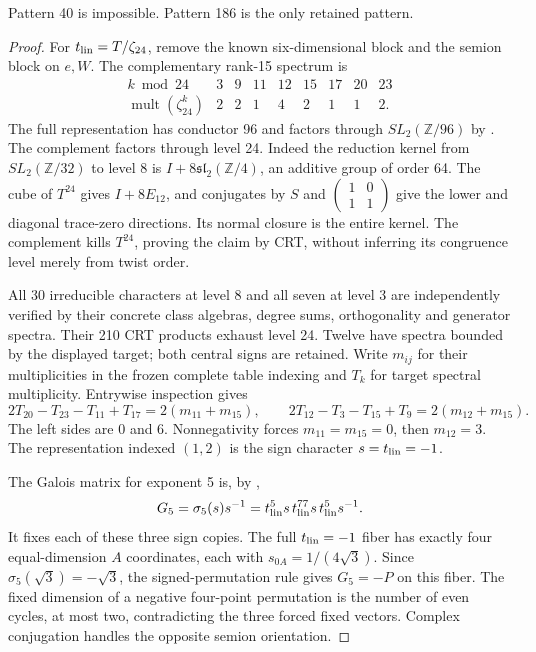 \begin{proposition}\label{prop:r928-pattern40}
Pattern 40 is impossible. Pattern 186 is the only retained pattern.
\end{proposition}
\begin{proof}
For $t_{\rm lin}=T/\zeta_{24}$, remove the known six-dimensional block
and the semion block on $e,W$. The complementary rank-15 spectrum is
\[
\begin{array}{c|rrrrrrrr}
k\bmod24&3&9&11&12&15&17&20&23\\ \hline
\operatorname{mult}(\zeta_{24}^k)&2&2&1&4&2&1&1&2 .
\end{array}
\]
The full representation has conductor 96 and factors through
$SL_2(\mathbb Z/96)$ by \cite[Theorem~II]{DLNGalois}.
The complement factors through level 24. Indeed the reduction kernel
from $SL_2(\mathbb Z/32)$ to level 8 is
$I+8\mathfrak{sl}_2(\mathbb Z/4)$, an additive group of order 64.
The cube of $T^{24}$ gives $I+8E_{12}$, and conjugates by $S$ and
$\left(\begin{smallmatrix}1&0\\1&1\end{smallmatrix}\right)$ give
the lower and diagonal trace-zero directions. Its normal closure is
the entire kernel. The complement kills $T^{24}$, proving the claim
by CRT, without inferring its congruence level merely from twist order.

All 30 irreducible characters at level 8 and all seven at level 3
are independently verified by their concrete class algebras, degree
sums, orthogonality and generator spectra. Their 210 CRT products
exhaust level 24. Twelve have spectra bounded by the displayed target;
both central signs are retained. Write $m_{ij}$ for their
multiplicities in the frozen complete table indexing and $T_k$ for
target spectral multiplicity. Entrywise inspection gives
\[
2T_{20}-T_{23}-T_{11}+T_{17}=2(m_{11}+m_{15}),\qquad
2T_{12}-T_3-T_{15}+T_9=2(m_{12}+m_{15}).
\]
The left sides are 0 and 6. Nonnegativity forces $m_{11}=m_{15}=0$,
then $m_{12}=3$. The representation indexed $(1,2)$ is the sign
character $s=t_{\rm lin}=-1$.

The Galois matrix for exponent 5 is, by \cite[Theorem~II]{DLNGalois},
\[
G_5=\sigma_5(s)s^{-1}
=t_{\rm lin}^5s\,t_{\rm lin}^{77}s\,t_{\rm lin}^5s^{-1}.
\]
It fixes each of these three sign copies. The full $t_{\rm lin}=-1$
fiber has exactly four equal-dimension $A$ coordinates, each with
$s_{0A}=1/(4\sqrt3)$. Since $\sigma_5(\sqrt3)=-\sqrt3$,
the signed-permutation rule gives $G_5=-P$ on this fiber.
The fixed dimension of a negative four-point permutation is the
number of even cycles, at most two, contradicting the three forced
fixed vectors. Complex conjugation handles the opposite semion
orientation.
\end{proof}

